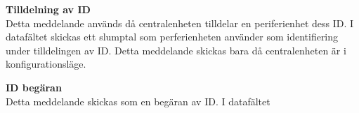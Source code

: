 \textbf{Tilldelning av ID} \\
Detta meddelande används då centralenheten tilldelar en periferienhet dess ID. I datafältet skickas ett slumptal som perferienheten använder som identifiering under tilldelingen av ID. Detta meddelande skickas bara då centralenheten är i konfigurationsläge.


\textbf{ID begäran} \\
Detta meddelande skickas som en begäran av ID. I datafältet

